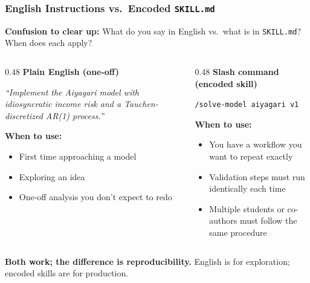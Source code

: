 \documentclass[10pt,english,aspectratio=169]{beamer}
\begin{document}
\begin{frame}
\frametitle{English Instructions vs.\ Encoded \texttt{SKILL.md}}

\textbf{Confusion to clear up:} What do you say in English vs.\ what is in \texttt{SKILL.md}? When does each apply?

\vspace{0.3cm}

\begin{columns}[T]
\begin{column}{0.48\textwidth}
\textbf{Plain English (one-off)}

\vspace{0.15cm}

\textit{``Implement the Aiyagari model with idiosyncratic income risk and a Tauchen-discretized AR(1) process.''}

\vspace{0.3cm}

\textbf{When to use:}
\begin{itemize}
    \item First time approaching a model
    \item Exploring an idea
    \item One-off analysis you don't expect to redo
\end{itemize}
\end{column}
\begin{column}{0.48\textwidth}
\textbf{Slash command (encoded skill)}

\vspace{0.15cm}

\texttt{/solve-model aiyagari v1}

\vspace{0.3cm}

\textbf{When to use:}
\begin{itemize}
    \item You have a workflow you want to repeat exactly
    \item Validation steps must run identically each time
    \item Multiple students or co-authors must follow the same procedure
\end{itemize}
\end{column}
\end{columns}

\vspace{0.3cm}

\textbf{Both work; the difference is reproducibility.} English is for exploration; encoded skills are for production.
\end{frame}
\end{document}
